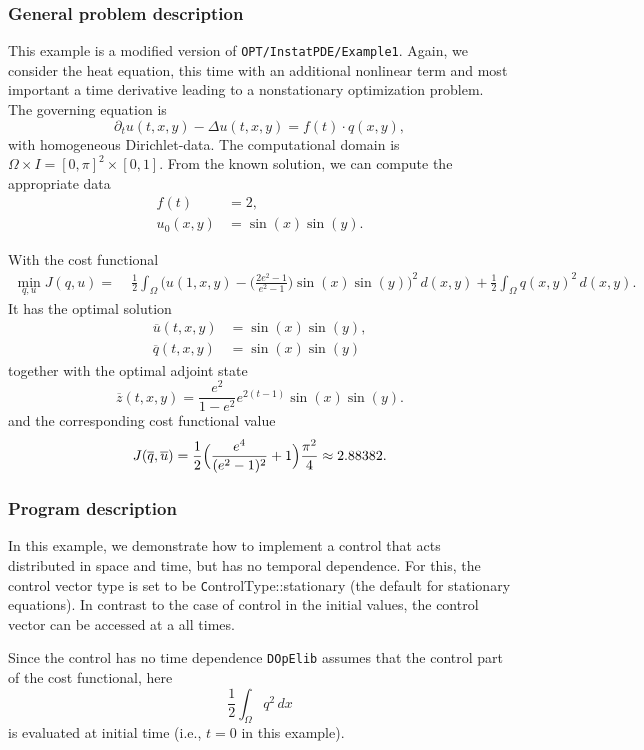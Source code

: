 \subsubsection{General problem description}

This example is a modified version of \texttt{OPT/InstatPDE/Example1}. 
Again, we consider the heat equation, this time with an additional nonlinear
term and most important a time derivative leading to a 
nonstationary optimization problem. The governing equation is
\begin{equation*}
\partial_t u(t,x,y) - \Delta u(t,x,y) = f(t)\cdot q(x,y),
\end{equation*}
with homogeneous Dirichlet-data.
The computational domain is $\Omega \times I = [0,\pi]^2 \times [0,1]$. From the known solution, we can compute the appropriate data 
\begin{align*}
f(t) &= 2,\\
u_0(x,y) &= \sin(x)\sin(y).
\end{align*}

With the cost functional 
\begin{align*}
 \min_{q,u} J(q,u) =&\; \frac{1}{2}\int_{\Omega} \Biggl(u(1,x,y) - \biggl(\frac{2e^2-1}{e^2-1}\biggr)\sin(x) \sin(y)\Biggr)^2\,d(x,y) + \frac{1}{2} \int_{\Omega} q(x,y)^2\,d(x,y).
\end{align*}
It has the optimal solution 
\begin{align*}
\overline{u}(t,x,y) &= \sin(x) \sin(y),\\
\overline{q}(t,x,y) &= \sin(x) \sin(y)
\end{align*}
together with the optimal adjoint state 
\[
 \overline{z}(t,x,y) = \frac{e^2}{1-e^2}e^{2(t-1)}\sin(x) \sin(y).
\]
and the corresponding cost functional value 
\[
J(\overline{q},\overline{u}) = \frac{1}{2} \Bigl(\frac{e^4}{(e^2-1)^2}+1\Bigr)\frac{\pi^2}{4} \approx 2.88382.
\]


\subsubsection{Program description}
In this example, we demonstrate how to implement a control that acts distributed in space and time,
but has no temporal dependence. For this, the control vector type is set to be 
{\texttt ControlType::stationary} (the default for stationary equations). In contrast to 
the case of control in the initial values, the control vector can be accessed at a 
all times. 

Since the control has no time dependence \texttt{DOpElib} assumes that the control part of 
the cost functional, here 
\[
 \frac{1}{2}\int_\Omega q^2\,dx
\]
is evaluated at initial time (i.e., $t=0$ in this example). 